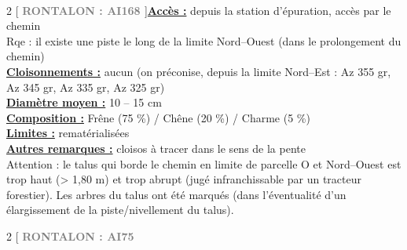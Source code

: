 \documentclass[a4paper,openany]{book}\usepackage[]{graphicx}\usepackage[]{color}
\begin{document}
\\\begin{multicols}{2}
[
\textbf{\textcolor{gray}{
\large RONTALON : AI168
}}
]\noindent\textbf{\underline{Accès :}} depuis la station d'épuration, accès par le chemin \\ Rqe : il existe une piste le long de la limite Nord--Ouest (dans le prolongement du chemin)\vspace{0.1cm} \\\noindent\textbf{\underline{Cloisonnements :}} aucun (on préconise, depuis la limite Nord--Est : Az 355 gr, Az 345 gr, Az 335 gr, Az 325 gr)\vspace{0.1cm} \\\noindent\textbf{\underline{Diamètre moyen :}} 10 -- 15 cm\vspace{0.1cm} \\\noindent\textbf{\underline{Composition :}} Frêne (75 \%) / Chêne (20 \%) / Charme (5 \%)\vspace{0.1cm} \\\noindent\textbf{\underline{Limites :}} rematérialisées\vspace{0.1cm} \\\noindent\textbf{\underline{Autres remarques :}} cloisos à tracer dans le sens de la pente \\ Attention : le talus qui borde le chemin en limite de parcelle O et Nord--Ouest est trop haut (> 1,80 m) et trop abrupt (jugé infranchissable par un tracteur forestier). Les arbres du talus ont été marqués (dans l'éventualité d'un élargissement de la piste/nivellement du talus).\vspace{0.1cm} \\\end{multicols}\begin{multicols}{2}
[
\textbf{\textcolor{gray}{
\large RONTALON : AI75
}}

\end{multicols}
\end{document}
